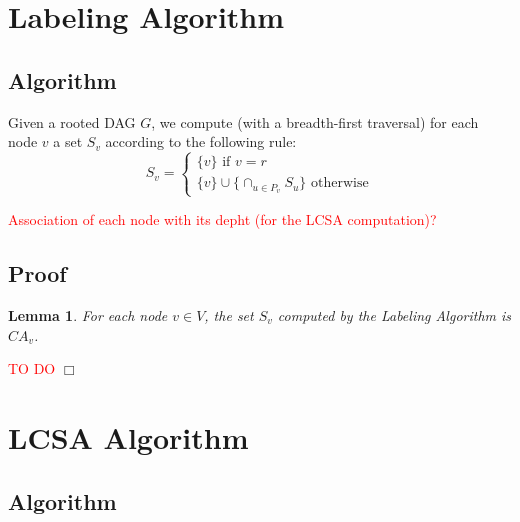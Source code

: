 \documentclass{paper}
\newtheorem{theorem}{Theorem}
\newtheorem{lemma}{Lemma}
\newenvironment{proof}{{\noindent\bf Proof. } }{{\hfill $\Box$}}
\begin{document}


\section{Labeling Algorithm}

\subsection{Algorithm}

Given a rooted DAG $G$, we compute (with a breadth-first traversal) for each node $v$ a set $S_v$ according to the following rule:
\[
S_v=\begin{cases}
\{v\} \text{ if } v=r\\
\{v\}\cup\{\cap_{u\in P_v} S_u\} \text{ otherwise}
\end{cases}
\]

\textcolor{red}{Association of each node with its depht (for the LCSA computation)?}


\subsection{Proof}

\begin{lemma}
For each node $v\in V$, the set $S_v$ computed by the Labeling Algorithm is $CA_v$.
\end{lemma}

\begin{proof}
\textcolor{red}{TO DO}
\end{proof}

\section{LCSA Algorithm}

\subsection{Algorithm}
\end{document}
